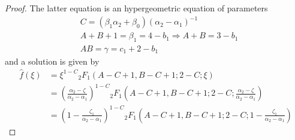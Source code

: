 \documentclass[11pt,a4paper,twoside,leqno,noamsfonts]{amsart}
\numberwithin{equation}{section}
\begin{document}
\begin{proof}
The latter equation is an hypergeometric equation of parameters 
\begin{align*}
&C=(\beta_1\alpha_2+\beta_0)(\alpha_2-\alpha_1)^{-1}\\
&A+B+1=\beta_1=4-b_1 \Rightarrow A+B=3-b_1\\
&AB=\gamma=c_1+2-b_1
\end{align*}
and a solution is given by 
\begin{align*}
\hat{f}(\xi)&=\xi^{1-C} {}_2F_1(A-C+1,B-C+1;2-C;\xi)\\
&=\left(\frac{\alpha_2-\zeta}{\alpha_2-\alpha_1}\right)^{1-C} {}_2F_1\left(A-C+1,B-C+1;2-C;\frac{\alpha_2-\zeta}{\alpha_2-\alpha_1}\right)\\
&=\left(1-\frac{\zeta_1}{\alpha_2-\alpha_1}\right)^{1-C} {}_2F_1\left(A-C+1,B-C+1;2-C;1-\frac{\zeta_1}{\alpha_2-\alpha_1}\right)
\end{align*} 

\end{proof}



\end{document}
